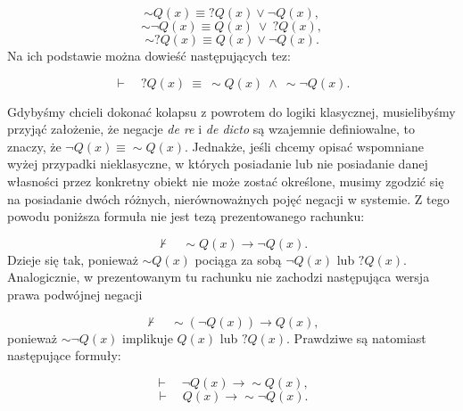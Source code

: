 \begin{equation}\tag{Z1}
\sim\! Q(x) \equiv ?Q(x) \lor \neg Q(x),
\end{equation}
\begin{equation}\tag{Z2}
\sim\!\neg Q(x) \equiv Q(x)\ \lor\ ?Q(x),
\end{equation}
\begin{equation}\tag{Z3}
\sim ?Q(x) \equiv Q(x) \lor \neg Q(x).
\end{equation}
Na ich podstawie można dowieść następujących tez:

\begin{equation}
   \vdash \quad ?Q(x)\ \equiv\ \sim\! Q(x)\ \land\ \sim\!\neg Q(x).
\end{equation}
 



Gdybyśmy chcieli dokonać kolapsu z powrotem do logiki klasycznej,
musielibyśmy przyjąć założenie, że negacje \textit{de re} i \textit{de
dicto} są wzajemnie definiowalne, to znaczy, że
$\neg Q(x) \equiv \sim\!Q(x)$. Jednakże, jeśli
chcemy opisać wspomniane wyżej przypadki nieklasyczne, w których
posiadanie lub nie posiadanie danej własności przez konkretny obiekt
nie może zostać określone, musimy zgodzić się na posiadanie dwóch
różnych, nierównoważnych pojęć negacji w systemie. Z tego powodu
poniższa formuła nie jest tezą prezentowanego rachunku:


\begin{equation}
    \nvdash \quad \sim\! Q(x) \to  \neg Q(x).
\end{equation}
Dzieje się tak, ponieważ $\sim\!Q(x)$ pociąga za sobą $\neg Q(x)$ lub
$?Q(x)$. Analogicznie, w prezentowanym tu rachunku nie zachodzi
następująca wersja prawa podwójnej negacji



\begin{equation}
   \nvdash \quad  \sim\! (\neg Q(\textit{x})) \to  Q(\textit{x}),
\end{equation}
ponieważ $\sim\!\neg Q(x)$ implikuje $Q(x)$ lub $?Q(x)$. Prawdziwe są
natomiast następujące formuły:



\begin{equation}
    \vdash \quad \neg Q(x) \to  \sim\! Q(x),
\end{equation}
\begin{equation}
    \vdash \quad Q(x) \to  \sim\! \neg Q(x).
\end{equation}






